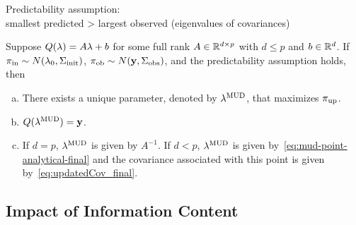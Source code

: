 \begin{frame}[t]

\centering
Predictability assumption:\\
smallest predicted > largest observed (eigenvalues of covariances)

\vskip 12pt
\begin{thm}\label{thm:MUD_existence_uniqueness}
Suppose  $Q(\lambda)=A\lambda+b$ for some full rank $A\in\mathbb{R}^{d\times p}$ with $d\leq p$ and $b\in\mathbb{R}^d$.
If $\operatorname*{\pi_{in}} \sim N(\lambda_0,\Sigma_\text{init})$, $\operatorname*{\pi_{ob}}\sim N(\mathbf{y},\Sigma_\text{obs})$, and the predictability assumption holds, then
\begin{enumerate}[(a)]
\item There exists a unique parameter, denoted by $\lambda^{\text{MUD}}$, that maximizes $\operatorname*{\pi_{up}}$.
\item $Q(\lambda^{\text{MUD}}) = \mathbf{y}$.
\item If $d=p$, $\lambda^{\text{MUD}}$ is given by $A^{-1}$. If $d<p$, $\lambda^{\text{MUD}}$ is given by~\eqref{eq:mud-point-analytical-final} and the covariance associated with this point is given by~\eqref{eq:updatedCov_final}.
\end{enumerate}
\end{thm}

\end{frame}

\subsection{Impact of Information Content}

